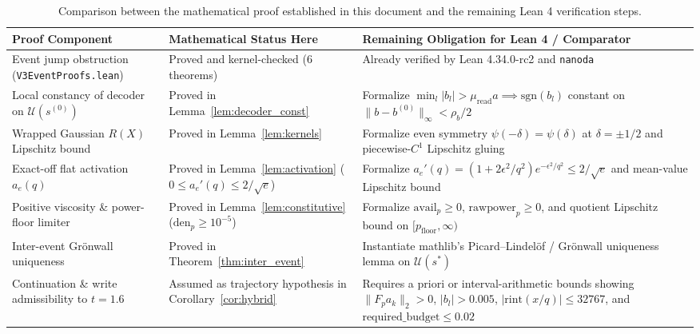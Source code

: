 \documentclass[11pt,a4paper]{article}
\theoremstyle{definition}
\begin{document}
\begin{table}[!ht]
\centering
\small
\begin{tabularx}{\textwidth}{>{\raggedright\arraybackslash}p{4.3cm}>{\raggedright\arraybackslash}p{4.3cm}>{\raggedright\arraybackslash}X}
\toprule
\textbf{Proof Component} & \textbf{Mathematical Status Here} & \textbf{Remaining Obligation for Lean 4 / Comparator} \\
\midrule
Event jump obstruction (\texttt{V3EventProofs.lean}) & Proved and kernel-checked (6 theorems) & Already verified by Lean 4.34.0-rc2 and \texttt{nanoda} \\
Local constancy of decoder on $\mathcal{U}(s^{(0)})$ & Proved in Lemma~\ref{lem:decoder_const} & Formalize $\min_l |b_l| > \mu_{\mathrm{read}}a \implies \mathrm{sgn}(b_l)$ constant on $\|b - b^{(0)}\|_\infty < \rho_b/2$ \\
Wrapped Gaussian $R(X)$ Lipschitz bound & Proved in Lemma~\ref{lem:kernels} & Formalize even symmetry $\psi(-\delta)=\psi(\delta)$ at $\delta = \pm 1/2$ and piecewise-$C^1$ Lipschitz gluing \\
Exact-off flat activation $a_e(q)$ & Proved in Lemma~\ref{lem:activation} ($0 \le a_e'(q) \le 2/\sqrt{e}$) & Formalize $a_e'(q) = (1+2\epsilon^2/q^2)e^{-\epsilon^2/q^2} \le 2/\sqrt{e}$ and mean-value Lipschitz bound \\
Positive viscosity \& power-floor limiter & Proved in Lemma~\ref{lem:constitutive} ($\mathrm{den}_p \ge 10^{-5}$) & Formalize $\mathrm{avail}_p \ge 0$, $\mathrm{rawpower}_p \ge 0$, and quotient Lipschitz bound on $[p_{\mathrm{floor}}, \infty)$ \\
Inter-event Gr\"onwall uniqueness & Proved in Theorem~\ref{thm:inter_event} & Instantiate mathlib's Picard--Lindel\"of / Gr\"onwall uniqueness lemma on $\mathcal{U}(s^*)$ \\
Continuation \& write admissibility to $t=1.6$ & Assumed as trajectory hypothesis in Corollary~\ref{cor:hybrid} & Requires a priori or interval-arithmetic bounds showing $\|F_p a_k\|_2 > 0$, $|b_l| > 0.005$, $|\mathrm{rint}(x/q)| \le 32767$, and $\mathrm{required\_budget} \le 0.02$ \\
\bottomrule
\end{tabularx}
\caption{Comparison between the mathematical proof established in this document and the remaining Lean 4 verification steps.}
\end{table}
\end{document}
